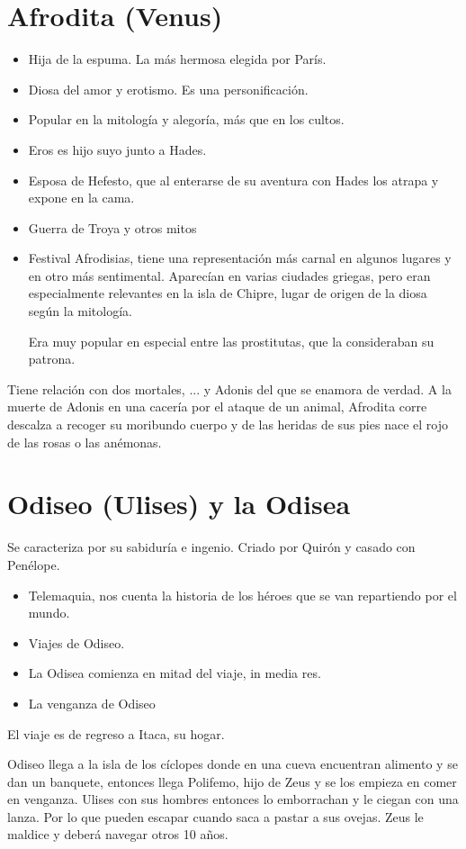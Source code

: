 \section{Afrodita (Venus)}
\begin{itemize}
	\item Hija de la espuma. La más hermosa elegida por París.
	\item Diosa del amor y erotismo. Es una personificación.
	\item Popular en la mitología y alegoría, más que en los cultos.
	\item Eros es hijo suyo junto a Hades.
	\item Esposa de Hefesto, que al enterarse de su aventura con Hades los atrapa y expone en la cama.
	\item Guerra de Troya y otros mitos
	\item Festival Afrodisias, tiene una representación más carnal en algunos lugares y en otro más sentimental. Aparecían en varias ciudades griegas, pero eran especialmente relevantes en la isla de Chipre, lugar de origen de la diosa según la mitología.

	      Era muy popular en especial entre las prostitutas, que la consideraban su patrona.
\end{itemize}

Tiene relación con dos mortales, ...  y Adonis del que se enamora de verdad. A la muerte de Adonis en una cacería por el ataque de un animal, Afrodita corre descalza a recoger su moribundo cuerpo y de las heridas de sus pies nace el rojo de las rosas o las anémonas.

\section{Odiseo (Ulises) y la Odisea}
Se caracteriza por su sabiduría e ingenio. Criado por Quirón y casado con Penélope.
\begin{itemize}
	\item Telemaquia, nos cuenta la historia de los héroes que se van repartiendo por el mundo.
	\item Viajes de Odiseo.
	\item La Odisea comienza en mitad del viaje, in media res.
	\item La venganza de Odiseo
\end{itemize}

El viaje es de regreso a Itaca, su hogar.

Odiseo llega a la isla de los cíclopes donde en una cueva encuentran alimento y se dan un banquete, entonces llega Polifemo, hijo de Zeus y se los empieza en comer en venganza. Ulises con sus hombres entonces lo emborrachan y le ciegan con una lanza. Por lo que pueden escapar cuando saca a pastar a sus ovejas. Zeus le maldice y deberá navegar otros 10 años.

